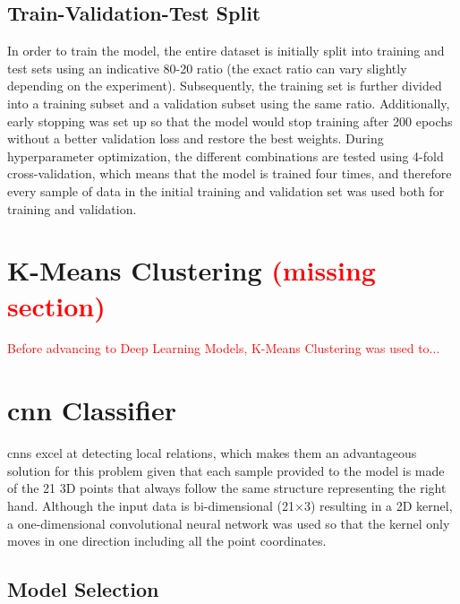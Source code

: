 \subsection{Train-Validation-Test Split}

In order to train the model, the entire dataset is initially split into training and test sets using an indicative 80-20 ratio (the exact ratio can vary slightly depending on the experiment). Subsequently, the training set is further divided into a training subset and a validation subset using the same ratio. Additionally, early stopping was set up so that the model would stop training after 200 epochs without a better validation loss and restore the best weights. During hyperparameter optimization, the different combinations are tested using 4-fold cross-validation, which means that the model is trained four times, and therefore every sample of data in the initial training and validation set was used both for training and validation.

\section{K-Means Clustering \textcolor{red}{(missing section)}}

\textcolor{red}{Before advancing to Deep Learning Models, K-Means Clustering was used to...}

\section{\acl{cnn} Classifier}
\label{section:cnn_classifier}

\acfp{cnn} excel at detecting local relations, which makes them an advantageous solution for this problem given that each sample provided to the model is made of the 21 3D points that always follow the same structure representing the right hand. Although the input data is bi-dimensional (21$\times$3) resulting in a 2D kernel, a one-dimensional convolutional neural network was used so that the kernel only moves in one direction including all the point coordinates.

\subsection{Model Selection}

